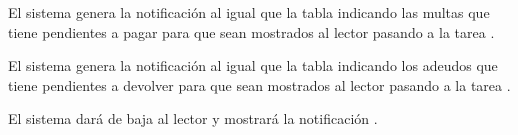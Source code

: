 \begin{PDescripcion}
\begin{enumerate}
      \Ppaso[\itarea]  El sistema genera la notificación  al igual que la tabla indicando las multas que tiene pendientes a pagar para que sean mostrados al lector pasando a la tarea . 

      \Ppaso[\itarea]  El sistema genera la notificación  al igual que la tabla indicando los adeudos que tiene pendientes a devolver para que sean mostrados al lector pasando a la tarea .

      \Ppaso[\itarea]  El sistema dará de baja al lector y mostrará la notificación .

    \end{enumerate}

\end{PDescripcion}

